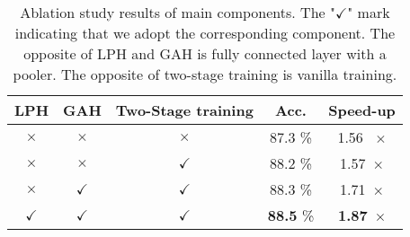 \begin{table}
  \renewcommand\arraystretch{0.9}
  \centering
  \caption{Ablation study results of main components. The "$\checkmark$" mark indicating that we adopt the corresponding component. 
  The opposite of LPH and GAH is fully connected layer with a pooler. The opposite of two-stage training is vanilla training. }
  \label{tb:ablation}
  \vspace{-6pt}
  \begin{tabular}{ccccc} 
    \toprule
    \textbf{LPH} & \textbf{GAH} & \textbf{Two-Stage training} & \textbf{Acc.} & \textbf{Speed-up}  \\ 
    \hline
    $\times$    &  $\times$    &      $\times$              &   87.3 \%           &   1.56 ~$\times$                \\
    $\times$     & $\times$     &     $\checkmark$                 &   88.2 \%           &   1.57~$\times$                 \\
    $\times$     &  $\checkmark$     &   $\checkmark$              &    88.3 \%          &   1.71~$\times$                  \\
    $\checkmark$    &  $\checkmark$  &     $\checkmark$             &   \textbf{88.5} \%           &   \textbf{1.87}~$\times$                 \\
    \bottomrule
    \end{tabular}
    \vspace{-6pt}
  \end{table}

